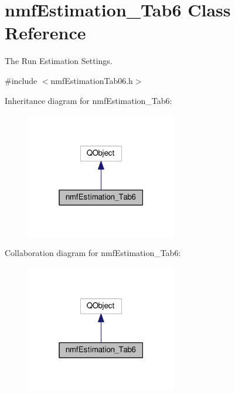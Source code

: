 \hypertarget{classnmf_estimation___tab6}{}\section{nmf\+Estimation\+\_\+\+Tab6 Class Reference}
\label{classnmf_estimation___tab6}


The Run Estimation Settings.  




{\ttfamily \#include $<$nmf\+Estimation\+Tab06.\+h$>$}



Inheritance diagram for nmf\+Estimation\+\_\+\+Tab6\+:\nopagebreak
\begin{figure}[H]
\begin{center}
\leavevmode
\includegraphics[width=187pt]{classnmf_estimation___tab6__inherit__graph}
\end{center}
\end{figure}


Collaboration diagram for nmf\+Estimation\+\_\+\+Tab6\+:\nopagebreak
\begin{figure}[H]
\begin{center}
\leavevmode
\includegraphics[width=187pt]{classnmf_estimation___tab6__coll__graph}
\end{center}
\end{figure}
